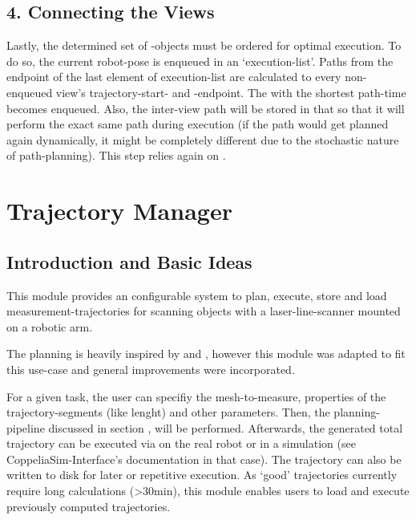 \documentclass[letterpaper,10pt,english]{sphinxmanual}
\begin{document}
\section{4. Connecting the Views}
\label{\detokenize{view_planning_detailed:connecting-the-views}}
Lastly, the determined set of {\hyperref[\detokenize{module_view:view}]{}}-objects must be ordered for optimal execution. To do so, the current robot-pose is enqueued in an ‘execution-list’.
Paths from the endpoint of the last element of execution-list are calculated to every non-enqueued view’s trajectory-start- and -endpoint. The {\hyperref[\detokenize{module_view:view}]{}} with the shortest path-time becomes enqueued.
Also, the inter-view path will be stored in that {\hyperref[\detokenize{module_view:view}]{}} so that it will perform the exact same path during execution (if the path would get planned again dynamically,
it might be completely different due to the stochastic nature of path-planning). This step relies again on .


\chapter{Trajectory Manager}
\label{\detokenize{module_trajectory_manager:trajectory-manager}}\label{\detokenize{module_trajectory_manager::doc}}\label{\detokenize{module_trajectory_manager:id1}}

\section{Introduction and Basic Ideas}
\label{\detokenize{module_trajectory_manager:introduction-and-basic-ideas}}
This module provides an configurable system to plan, execute, store and load measurement-trajectories for scanning objects with a laser-line-scanner mounted on a robotic arm.

The planning is heavily inspired by 
and , however this module was adapted to fit this use-case and general improvements were incorporated.

For a given task, the user can specifiy the mesh-to-measure, properties of the trajectory-segments (like lenght) and other parameters.
Then, the planning-pipeline discussed in section {\hyperref[\detokenize{view_planning_detailed:view-planning-detailed}]{}}, will be performed. Afterwards, the generated total trajectory can be executed via
 on the real robot or in a simulation (see CoppeliaSim-Interface’s documentation in that case). The trajectory can also be
written to disk for later or repetitive execution. As ‘good’ trajectories currently require long calculations (\textgreater{}30min),
this module enables users to load and execute previously computed trajectories.
\end{document}
